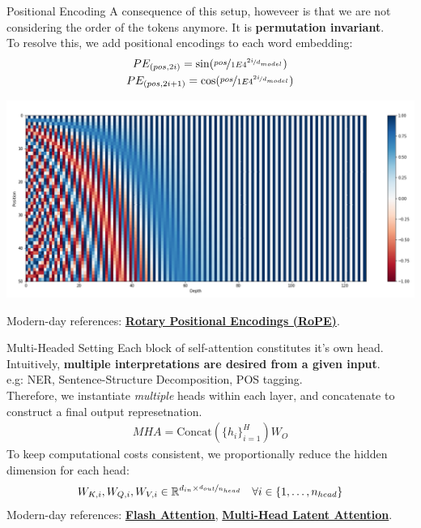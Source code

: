 \documentclass{beamer}
\begin{document}
\begin{frame}{Positional Encoding}
	A consequence of this setup, howeveer is that we are not considering the order of the tokens anymore. It is \textbf{permutation invariant}. \pause \newline \\

	To resolve this, we add positional encodings to each word embedding:
	\vspace{-.75em}
	\begin{gather}
		PE_{(pos, 2i)} = \sin(\nicefrac{pos}{1E4^{\nicefrac{2i}{d_{model}}}}) \\
		PE_{(pos, 2i+1)} = \cos(\nicefrac{pos}{1E4^{\nicefrac{2i}{d_{model}}}})
	\end{gather}
	\begin{center}
		\vspace{-.75em}
		\includegraphics[width=.6\textwidth]{img/positional_encoding.png}
		\vspace{-.75em}
	\end{center} \pause
	Modern-day references: \textbf{\href{https://arxiv.org/abs/2104.09864}{Rotary Positional Encodings (RoPE)}}.
\end{frame}

\begin{frame}{Multi-Headed Setting}
	Each block of self-attention constitutes it's own head. \pause \newline \\

	Intuitively, \textbf{multiple interpretations are desired from a given input}. \\
	e.g: NER, Sentence-Structure Decomposition, POS tagging. \pause \newline \\

	Therefore, we instantiate \textit{multiple} heads within each layer, and concatenate to construct a final output represetnation.
	\begin{gather}
		MHA = \text{Concat}(\{h_i\}^H_{i=1})W_O
	\end{gather} \pause
	To keep computational costs consistent, we proportionally reduce the hidden dimension for each head:
	\begin{gather}
		W_{K, i}, W_{Q, i}, W_{V, i} \in \mathbb{R}^{d_{in} \times \nicefrac{d_{out}}{n_{head}}} \quad \forall i \in \{1, \ldots, n_{head}\}
	\end{gather} \pause
	Modern-day references: \textbf{\href{https://arxiv.org/abs/2205.14135}{Flash Attention}}, \textbf{\href{https://arxiv.org/abs/2502.07864}{Multi-Head Latent Attention}}.
\end{frame}
\end{document}
